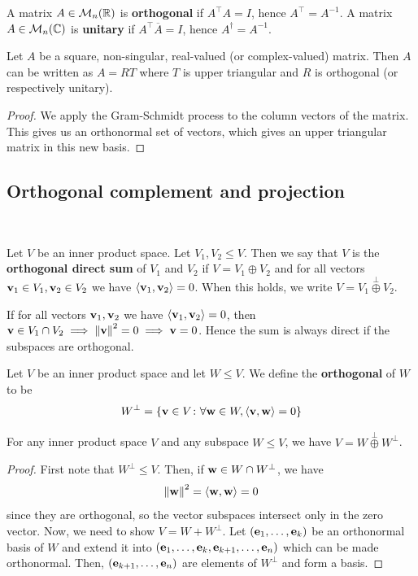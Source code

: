 \documentclass[a4paper,11pt]{article}
\begin{document}
\begin{definition}
	A matrix \( A \in {\mathcal{M}}_n(\mathbb R) \) is \textbf{orthogonal} if \( A^\top A = I \), hence \( A^\top = A^{-1} \).
	A matrix \( A \in {\mathcal{M}}_n(\mathbb C) \) is \textbf{unitary} if \( A^\top \overline A = I \), hence \( A^\dagger = A^{-1} \).
\end{definition}
\begin{proposition}
	Let \( A \) be a square, non-singular, real-valued (or complex-valued) matrix.
	Then \( A \) can be written as \( A = RT \) where \( T \) is upper triangular and \( R \) is orthogonal (or respectively unitary).
\end{proposition}
\begin{proof}
	We apply the Gram-Schmidt process to the column vectors of the matrix.
	This gives us an orthonormal set of vectors, which gives an upper triangular matrix in this new basis.
\end{proof}

\subsection{Orthogonal complement and projection}
\ \vspace*{-1.5em}
\begin{definition}
	Let \( V \) be an inner product space.
	Let \( V_1, V_2 \leq V \).
	Then we say that \( V \) is the \textbf{orthogonal direct sum} of \( V_1 \) and \( V_2 \) if \( V = V_1 \oplus V_2 \) and for all vectors \( {\bf v}_1\in V_1, {\bf v}_2\in V_2 \) we have \( \left\langle{{\bf v}_1, {\bf v}_2}\right\rangle = 0 \).
	When this holds, we write \( V = V_1 \overset{\perp}{\oplus} V_2 \).
\end{definition}
\begin{remark}
	If for all vectors \( {\bf v}_1, {\bf v}_2 \) we have \( \left\langle{{\bf v}_1, {\bf v}_2}\right\rangle = 0 \), then \( {\bf v} \in V_1 \cap V_2 \implies \norm{{\bf v}}^2 = 0 \implies {\bf v} = 0 \).
	Hence the sum is always direct if the subspaces are orthogonal.
\end{remark}
\begin{definition}
	Let \( V \) be an inner product space and let \( W \leq V \).
	We define the \textbf{orthogonal} of \( W \) to be
	\[
		W^\perp = \qty{{\bf v}\in V \colon \forall {\bf w}\in W, \left\langle{{\bf v},{\bf w}}\right\rangle = 0}
	\]
\end{definition}
\begin{lemma}
	For any inner product space \( V \) and any subspace \( W \leq V \), we have \( V = W \overset{\perp}{\oplus} W^\perp \).
\end{lemma}
\begin{proof}
	First note that \( W^\perp \leq V \).
	Then, if \( {\bf w} \in W \cap W^\perp \), we have
	\[
		\norm{{\bf w}}^2 = \left\langle{{\bf w}, {\bf w}}\right\rangle = 0
	\]
	since they are orthogonal, so the vector subspaces intersect only in the zero vector.
	Now, we need to show \( V = W + W^\perp \).
	Let \( ({\bf e}_1, \dots, {\bf e}_k) \) be an orthonormal basis of \( W \) and extend it into \( ({\bf e}_1, \dots, {\bf e}_k, {\bf e}_{k+1}, \dots, {\bf e}_n) \) which can be made orthonormal.
	Then, \( ({\bf e}_{k+1}, \dots, {\bf e}_n) \) are elements of \( W^\perp \) and form a basis.
\end{proof}
\end{document}
